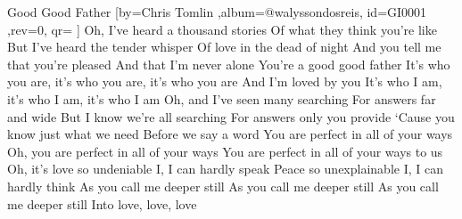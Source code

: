 \beginsong
{Good Good Father %
}[by={Chris Tomlin  %
},album={@walyssondosreis},
id={GI0001 %
},rev={0}, %
qr={ %
}]
\beginverse
Oh, I've heard a thousand stories
Of what they think you're like
But I've heard the tender whisper
Of love in the dead of night
And you tell me that you're pleased
And that I'm never alone
\endverse
\beginchorus
You're a good good father
It's who you are, it's who you are, it's who you are
And I'm loved by you
It's who I am, it's who I am, it's who I am
\endchorus
\beginverse
Oh, and I've seen many searching
For answers far and wide
But I know we're all searching
For answers only you provide
‘Cause you know just what we need
Before we say a word
\endverse
\beginverse
You are perfect in all of your ways
Oh, you are perfect in all of your ways
You are perfect in all of your ways to us
\endverse
\beginverse
Oh, it's love so undeniable
I, I can hardly speak
Peace so unexplainable
I, I can hardly think
As you call me deeper still
As you call me deeper still
As you call me deeper still
Into love, love, love
\endverse


